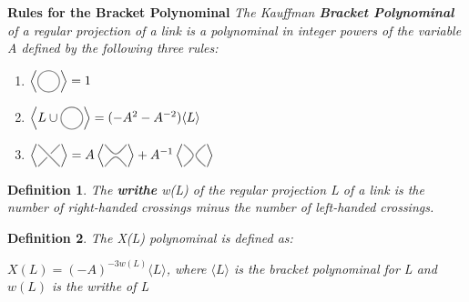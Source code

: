 \documentclass[executivepaper]{article}
\newtheorem{definition}{Definition}
\newcommand{\KP}[1]{%
  \begin{tikzpicture}[baseline=-\dimexpr\fontdimen22\textfont2\relax]
  #1
  \end{tikzpicture}%
}
\newcommand{\KPA}{%
  \KP{\filldraw[color=gray, fill=none, thick] circle (0.3);}%
}
\newcommand{\KPB}{%
  \KP{
    \draw[color=gray,thick] (-0.3,0.3) -- (0.3,-0.3);
    \draw[color=gray,thick] (-0.3,-0.3) -- (-0.05,-0.05);
    \draw[color=gray,thick] (0.05,0.05) -- (0.3,0.3);
  }%
}
\newcommand{\KPC}{%
  \KP{%
    \draw[color=gray,thick] (-0.3,0.3) .. controls (0,-0.05) .. (0.3,0.3);
    \draw[color=gray,thick] (-0.3,-0.3) .. controls (0,0.05) .. (0.3,-0.3);
  }%
}
\newcommand{\KPD}{%
  \KP{%
    \draw[color=gray,thick] (-0.3,-0.3) .. controls (0.05,0) .. (-0.3,0.3);
    \draw[color=gray,thick] (0.3,-0.3) .. controls (-0.05,0) .. (0.3,0.3);
  }%
}
\begin{document}
\begin{tcolorbox}

\textbf{Rules for the Bracket Polynominal} \textit{The Kauffman \textbf{Bracket Polynominal} of a regular projection of a link is a polynominal in integer powers of the variable A defined by the following three rules:}

\begin{center}

\begin{enumerate}
\item
  $\left\langle\KPA\right\rangle=1$

\item
  $\left\langle L \cup \KPA\right\rangle=(-A^{2}-A^{-2})\langle L\rangle$

\item
  $\left\langle\KPB\right\rangle=
  A\left\langle\KPC\right\rangle + A^{-1} \left\langle \KPD \right\rangle$

\end{enumerate}

\end{center}

\end{tcolorbox}

\vspace{2mm}

\begin{tcolorbox}

\begin{definition}

\textit{The \textbf{writhe} w(L) of the regular projection L of a link is the number of right-handed crossings minus the number of left-handed crossings.}

\end{definition}

\end{tcolorbox}

\vspace{2mm}

\begin{tcolorbox}

\begin{definition}

\textit{The X(L) polynominal is defined as:}

\begin{center}

$X(L)=(-A)^{-3w(L)} \big \langle L \big \rangle$, where $\big \langle L \big \rangle$ is the bracket polynominal for L and $w(L)$ is the writhe of L

\end{center}

\end{definition}

\end{tcolorbox}
\end{document}

